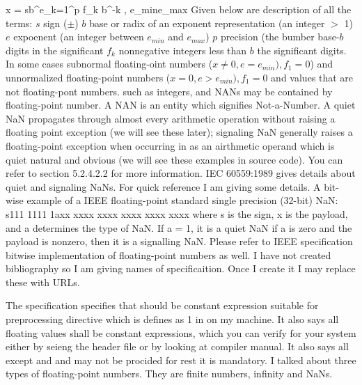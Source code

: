 \setupformulas[left={[},right={]},numberstyle=bold]
\placeformula
\startformula
x = sb^e\sum_{k=1}^p f_k b^{-k} , e_{min}\le e\ge_{max}
\stopformula
Given below are description of all the terms:\hfill\break
\indent $s$ sign ($\pm$)\hfill\break
\indent $b$ base or radix of an exponent representation (an integer $>$
1)\hfill\break
\indent $e$ expoenent (an integer between $e_{min}$ and $e_{max}$)\hfill\break
\indent $p$ precision (the bumber base-$b$ digits in the significant\hfill\break
\indent $f_k$ nonnegative integers less than $b$ the significant
digits.\hfill\break
In some cases subnormal floating-oint numbers ($x\ne0, e=e_{min}),
f_1=0$) and unnormalized floating-point numbers ($x=0, e\gt e_{min}),
f_1=0$ and values that are not floating-pont numbers. such as
integers, and NANs may be contained by floating-point number. A NAN is
an entity which signifies Not-a-Number. A quiet NaN propagates through
almost every arithmetic operation without raising a floating point
exception (we will see these later); signaling  NaN generally raises a
floating-point exception when occurring in as an airthmetic operand
which is quiet natural and obvious (we will see these examples in
source code). You can refer to section 5.2.4.2.2 for more information.
IEC 60559:1989 gives details about quiet and signaling NaNs. For quick
reference I am giving some details. A bit-wise example of a IEEE
floating-point standard single precision (32-bit) NaN: s111 1111 1axx
xxxx xxxx xxxx xxxx xxxx where s is the sign, x is the payload, and a
determines the type of NaN. If a = 1, it is a quiet NaN if a is zero
and the payload is nonzero, then it is a signalling NaN. Please refer
to IEEE specification bitwise implementation of floating-point numbers
as well. I have not created bibliography so I am giving names of
specificaition. Once I create it I may replace these with URLs.

The specification specifies that  should be constant
expression suitable for  preprocessing directive which is
defines as 1 in  on my machine. It also says all
floating values shall be constant expressions, which you can verify
for your system either by seieng the header file or by looking at
compiler manual. It also says all except  and  and  may not be procided for rest
it is mandatory. I talked about three types of floating-point
numbers. They are finite numbers, infinity and NaNs.

